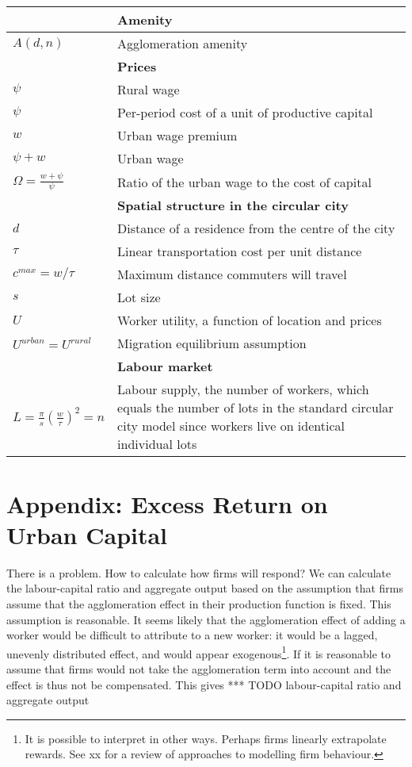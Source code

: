 \begin{center}
\begin{longtable}{lp{10cm}}
\hline
	&\textbf{Amenity}\\ \hline
$A(d, n)$   &  Agglomeration amenity\\
\hline
		& \textbf{Prices}\\ \hline
$\psi$  &  Rural wage\\
$\psi$  &  Per-period cost of a unit of productive capital\\
$w$  &  Urban wage premium\\
$\psi + w$  &  Urban wage\\
$\Omega=\frac{w+\psi}{\psi}$  &  Ratio of the urban wage to the  cost of capital\\
\hline
		&\textbf{Spatial structure in the circular city}\\ \hline		
$d$  &  Distance of a residence from the centre of the city\\
$\tau$  &  Linear transportation cost per unit distance\\
$c^{max} = w/\tau$  &  Maximum distance commuters will travel%
\\
$s$ & Lot size\\
$U$  &  Worker utility, a function of location and prices\\
$U^{urban}=U^{rural} $  &   Migration equilibrium assumption\\
\hline
		& \textbf{Labour market}\\ \hline
$L= \frac{\pi}{s}(\frac{w}{\tau})^2 = n$  &  
Labour supply, the number of workers, which equals the number of lots in the standard circular city model since workers live on identical individual lots\\
\end{longtable}  \end{center}



\chapter*{Appendix: Excess Return on Urban Capital}\label{Sec:ExcessProfit}

There is a problem. How to calculate how firms will respond?
We can calculate the labour-capital ratio and aggregate output based on the assumption that firms assume that the agglomeration effect in their production function is fixed. This assumption is reasonable. It seems likely that the agglomeration effect of adding a worker would be difficult to attribute to a new worker: it would be a lagged, unevenly distributed effect, and would appear exogenous\footnote{It is possible to interpret in other ways. Perhaps firms linearly extrapolate rewards. See xx for a review of approaches to modelling firm behaviour.}. 
If it is reasonable to assume that firms would not take the agglomeration term into account and the effect is thus not be compensated. This gives *** TODO labour-capital ratio and aggregate output


